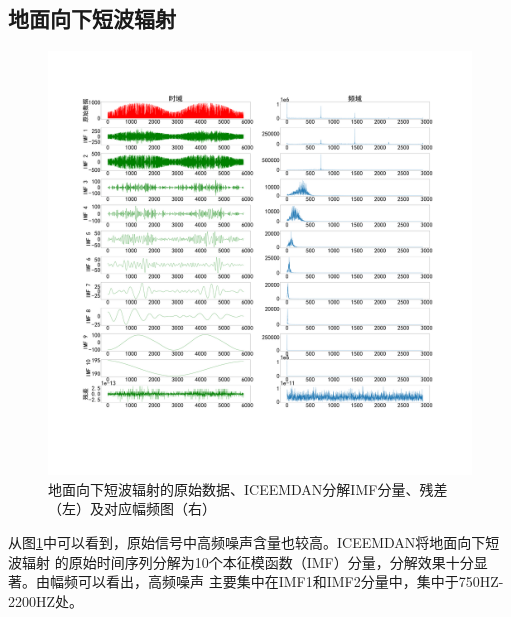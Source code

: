 \documentclass[AutoFakeBold]{LZUThesis}
\begin{document}
\subsection{地面向下短波辐射}
\begin{figure}[H]
	\centering
    \includegraphics[width=1\textwidth]{figures/srad.pdf}
    \caption{地面向下短波辐射的原始数据、ICEEMDAN分解IMF分量、残差（左）及对应幅频图（右）}
    \label{fig_srad}
\end{figure}

从图\ref{fig_srad}中可以看到，原始信号中高频噪声含量也较高。ICEEMDAN将地面向下短波辐射
的原始时间序列分解为10个本征模函数（IMF）分量，分解效果十分显著。由幅频可以看出，高频噪声
主要集中在IMF1和IMF2分量中，集中于750HZ-2200HZ处。
\end{document}
